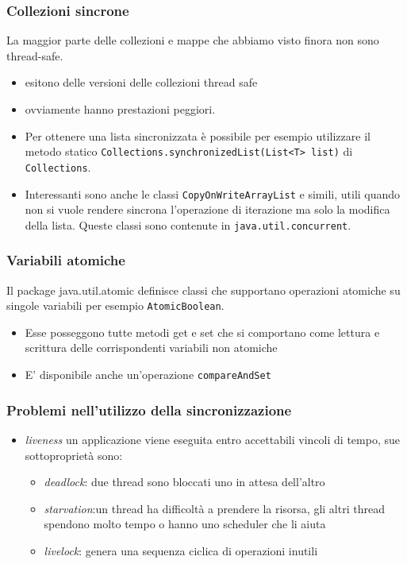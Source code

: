 \documentclass{beamer}
\begin{document}
\begin{frame}
\frametitle{Collezioni sincrone}
La maggior parte delle collezioni e mappe che abbiamo visto finora non sono thread-safe. 
\begin{itemize}
\item esitono delle versioni delle collezioni thread safe 
\item ovviamente hanno prestazioni peggiori. 
\item Per ottenere una lista sincronizzata \`e possibile per esempio utilizzare il metodo statico \texttt{Collections.synchronizedList(List<T> list)} di \texttt{Collections}. 
\item Interessanti sono anche le classi \texttt{CopyOnWriteArrayList} e simili, utili quando non si vuole rendere sincrona l'operazione di iterazione ma solo la modifica della lista. Queste classi sono contenute in \texttt{java.util.concurrent}.
\end{itemize}
\end{frame}

\begin{frame}
\frametitle{Variabili atomiche}
Il package java.util.atomic definisce classi che supportano operazioni atomiche su singole variabili per esempio \texttt{AtomicBoolean}.
\begin{itemize}
\item Esse posseggono tutte metodi get e set che si comportano come lettura e scrittura delle corrispondenti variabili non atomiche
\item E' disponibile anche un'operazione \texttt{compareAndSet}
\end{itemize} 
\end{frame}

\begin{frame}
\frametitle{Problemi nell'utilizzo della sincronizzazione}
\begin{itemize}
\item \emph{liveness} un applicazione viene eseguita entro accettabili vincoli di tempo, sue sottopropriet\`a sono:
\begin{itemize}
\item \emph{deadlock}: due thread sono bloccati uno in attesa dell'altro
\item \emph{starvation}:un thread ha difficolt\`a a prendere la risorsa, gli altri thread spendono molto tempo o hanno uno scheduler che li aiuta
\item \emph{livelock}: genera una sequenza ciclica di operazioni inutili 
\end{itemize}
\end{itemize}
\end{frame}
\end{document}

